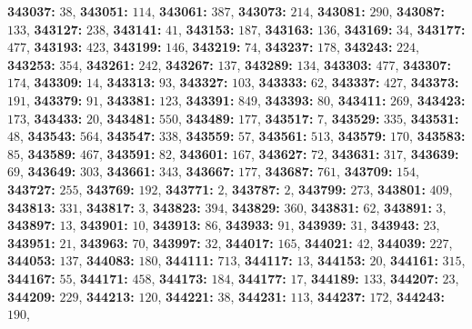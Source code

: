\textsf{\bfseries 343037:} $38$, \textsf{\bfseries 343051:} $114$, \textsf{\bfseries 343061:} $387$, \textsf{\bfseries 343073:} $214$, \textsf{\bfseries 343081:} $290$, \textsf{\bfseries 343087:} $133$, \textsf{\bfseries 343127:} $238$, \textsf{\bfseries 343141:} $41$, \textsf{\bfseries 343153:} $187$, \textsf{\bfseries 343163:} $136$, \textsf{\bfseries 343169:} $34$, \textsf{\bfseries 343177:} $477$, \textsf{\bfseries 343193:} $423$, \textsf{\bfseries 343199:} $146$, \textsf{\bfseries 343219:} $74$, \textsf{\bfseries 343237:} $178$, \textsf{\bfseries 343243:} $224$, \textsf{\bfseries 343253:} $354$, \textsf{\bfseries 343261:} $242$, \textsf{\bfseries 343267:} $137$, \textsf{\bfseries 343289:} $134$, \textsf{\bfseries 343303:} $477$, \textsf{\bfseries 343307:} $174$, \textsf{\bfseries 343309:} $14$, \textsf{\bfseries 343313:} $93$, \textsf{\bfseries 343327:} $103$, \textsf{\bfseries 343333:} $62$, \textsf{\bfseries 343337:} $427$, \textsf{\bfseries 343373:} $191$, \textsf{\bfseries 343379:} $91$, \textsf{\bfseries 343381:} $123$, \textsf{\bfseries 343391:} $849$, \textsf{\bfseries 343393:} $80$, \textsf{\bfseries 343411:} $269$, \textsf{\bfseries 343423:} $173$, \textsf{\bfseries 343433:} $20$, \textsf{\bfseries 343481:} $550$, \textsf{\bfseries 343489:} $177$, \textsf{\bfseries 343517:} $7$, \textsf{\bfseries 343529:} $335$, \textsf{\bfseries 343531:} $48$, \textsf{\bfseries 343543:} $564$, \textsf{\bfseries 343547:} $338$, \textsf{\bfseries 343559:} $57$, \textsf{\bfseries 343561:} $513$, \textsf{\bfseries 343579:} $170$, \textsf{\bfseries 343583:} $85$, \textsf{\bfseries 343589:} $467$, \textsf{\bfseries 343591:} $82$, \textsf{\bfseries 343601:} $167$, \textsf{\bfseries 343627:} $72$, \textsf{\bfseries 343631:} $317$, \textsf{\bfseries 343639:} $69$, \textsf{\bfseries 343649:} $303$, \textsf{\bfseries 343661:} $343$, \textsf{\bfseries 343667:} $177$, \textsf{\bfseries 343687:} $761$, \textsf{\bfseries 343709:} $154$, \textsf{\bfseries 343727:} $255$, \textsf{\bfseries 343769:} $192$, \textsf{\bfseries 343771:} $2$, \textsf{\bfseries 343787:} $2$, \textsf{\bfseries 343799:} $273$, \textsf{\bfseries 343801:} $409$, \textsf{\bfseries 343813:} $331$, \textsf{\bfseries 343817:} $3$, \textsf{\bfseries 343823:} $394$, \textsf{\bfseries 343829:} $360$, \textsf{\bfseries 343831:} $62$, \textsf{\bfseries 343891:} $3$, \textsf{\bfseries 343897:} $13$, \textsf{\bfseries 343901:} $10$, \textsf{\bfseries 343913:} $86$, \textsf{\bfseries 343933:} $91$, \textsf{\bfseries 343939:} $31$, \textsf{\bfseries 343943:} $23$, \textsf{\bfseries 343951:} $21$, \textsf{\bfseries 343963:} $70$, \textsf{\bfseries 343997:} $32$, \textsf{\bfseries 344017:} $165$, \textsf{\bfseries 344021:} $42$, \textsf{\bfseries 344039:} $227$, \textsf{\bfseries 344053:} $137$, \textsf{\bfseries 344083:} $180$, \textsf{\bfseries 344111:} $713$, \textsf{\bfseries 344117:} $13$, \textsf{\bfseries 344153:} $20$, \textsf{\bfseries 344161:} $315$, \textsf{\bfseries 344167:} $55$, \textsf{\bfseries 344171:} $458$, \textsf{\bfseries 344173:} $184$, \textsf{\bfseries 344177:} $17$, \textsf{\bfseries 344189:} $133$, \textsf{\bfseries 344207:} $23$, \textsf{\bfseries 344209:} $229$, \textsf{\bfseries 344213:} $120$, \textsf{\bfseries 344221:} $38$, \textsf{\bfseries 344231:} $113$, \textsf{\bfseries 344237:} $172$, \textsf{\bfseries 344243:} $190$, 
